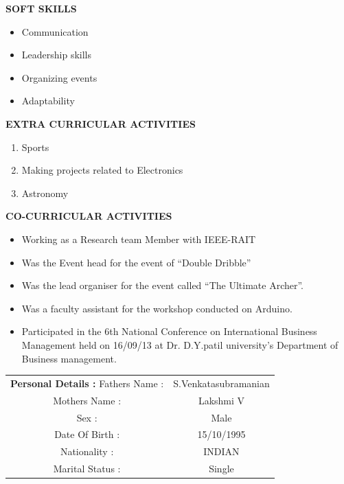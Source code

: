 \documentclass[a4paper]{article}
\begin{document}
\begin{flushleft}
\textbf {SOFT SKILLS}\\
\begin{itemize}
\item Communication
\item Leadership skills
\item Organizing events
\item Adaptability
\end{itemize}
\end{flushleft}

\begin{flushleft}
\textbf {EXTRA CURRICULAR ACTIVITIES}\\
\begin{enumerate}
\item Sports
\item Making projects related to Electronics
\item Astronomy
\end{enumerate}
\end{flushleft}


\begin{flushleft}
\vspace{2in}
\textbf {CO-CURRICULAR ACTIVITIES}\\
\begin{itemize}
\item Working as a Research team Member with IEEE-RAIT
\item 	Was the Event head for the event of  “Double Dribble”
\item 	Was the lead organiser for the event called “The Ultimate Archer”.
\item 	Was a  faculty assistant for the workshop conducted on Arduino.
\item 	Participated in the 6th National Conference on International Business Management held on 16/09/13 at Dr. D.Y.patil university’s Department of Business management.
\end{itemize}
\end{flushleft}

\vspace{2mm}
\begin{flushleft}
\begin{tabular}{ cc }
\textbf {Personal Details :  }
 \hfill Fathers Name : & S.Venkatasubramanian  \\ 
 \hfill Mothers Name : & Lakshmi V \\  
 \hfill Sex : & Male   \\ 
 \hfill Date Of Birth : &15/10/1995  \\
 \hfill Nationality : & INDIAN  \\
 \hfill Marital Status : & Single
\end{tabular}
\end{flushleft}
\end{document}
